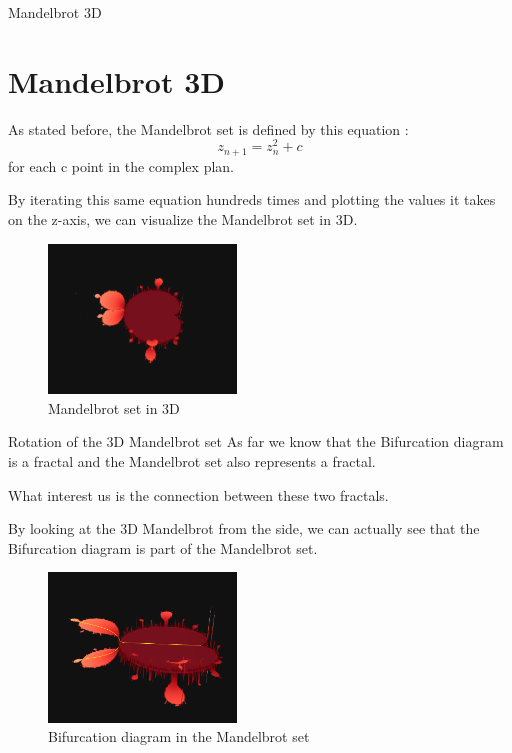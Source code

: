 \documentclass [xcolor=svgnames, t] {beamer}
\begin{document}
\begin{frame}{Mandelbrot 3D}
\section{Mandelbrot 3D}
    As stated before, the Mandelbrot set is defined by this equation : $$z_{n+1}=z_n^2+c$$ for each c point in the complex plan. 
    
    By iterating this same equation hundreds times and plotting the values it takes on the z-axis, we can visualize the Mandelbrot set in 3D.  
    \begin{figure}[!h]
    \begin{center}
   \caption{\label{étiquette} Mandelbrot set in 3D}
   \includegraphics[width=5cm]{Mandelbrot 3D view 0.png}
   \end{center}
    \end{figure}
\end{frame}

\begin{frame}{Rotation of the 3D Mandelbrot set}
    As far we know that the Bifurcation diagram is a fractal and the Mandelbrot set also represents a fractal.    
    
    What interest us is the connection between these two fractals.
      
    By looking at the 3D Mandelbrot from the side, we can actually see that the Bifurcation diagram is part of the Mandelbrot set.
    \begin{figure}[!h]
    \begin{center}
   \caption{\label{étiquette} Bifurcation diagram in the Mandelbrot set}
   \includegraphics[width=5cm]{Mandelbrot 3D side view 0.png}
   \end{center}
    \end{figure}
\end{frame}
\end{document}

